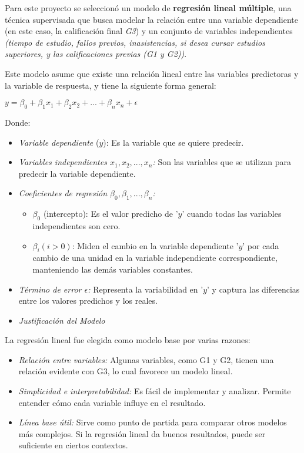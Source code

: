 \documentclass{article}
\begin{document}
Para este proyecto se seleccionó un modelo de \textbf{regresión lineal múltiple}, una técnica supervisada que busca modelar la relación entre una variable dependiente (en este caso, la calificación final \textit{G3}) y un conjunto de variables independientes \textit{(tiempo de estudio, fallos previos, inasistencias, si desea cursar estudios superiores, y las calificaciones previas (G1 y G2))}.


Este modelo asume que existe una relación lineal entre las variables predictoras y la variable de respuesta, y tiene la siguiente forma general:

\begin{center}
    $y=\beta _{0}+\beta _{1}x_{1}+\beta _{2}x_{2}+...+\beta _{n}x_{n}+\epsilon$
\end{center}

Donde:
\begin{itemize}[label=\--]
\item \textit{Variable dependiente} ($y$): Es la variable que se quiere predecir.
\item \textit{Variables independientes $x_{1},x_{2},...,x_{n}$:} Son las variables que se utilizan para predecir la variable dependiente.
\item \textit{Coeficientes de regresión $\beta _{0},\beta _{1},...,\beta _{n}$:}
  
    \begin{itemize}[label=\star]
        \item $\beta _{0}$ (intercepto): Es el valor predicho de '$y$' cuando todas las variables independientes son cero.
        \item $\beta _{i} (i>0)$: Miden el cambio en la variable dependiente '$y$' por cada cambio de una unidad en la variable independiente correspondiente, manteniendo las demás variables constantes.
    \end{itemize}

\item \textit{Término de error $\epsilon$:} Representa la variabilidad en '$y$' y captura las diferencias entre los valores predichos y los reales.
\end{itemize}

\begin{itemize}
    \item \textit{Justificación del Modelo}
\end{itemize}

La regresión lineal fue elegida como modelo base por varias razones:

\begin{itemize}[label=\--]
\item \textit{Relación entre variables:} Algunas variables, como G1 y G2, tienen una relación evidente con G3, lo cual favorece un modelo lineal.
\item \textit{Simplicidad e interpretabilidad:} Es fácil de implementar y analizar. Permite entender cómo cada variable influye en el resultado.
\item \textit{Línea base útil:} Sirve como punto de partida para comparar otros modelos más complejos. Si la regresión lineal da buenos resultados, puede ser suficiente en ciertos contextos.
\end{itemize}
\end{document}
